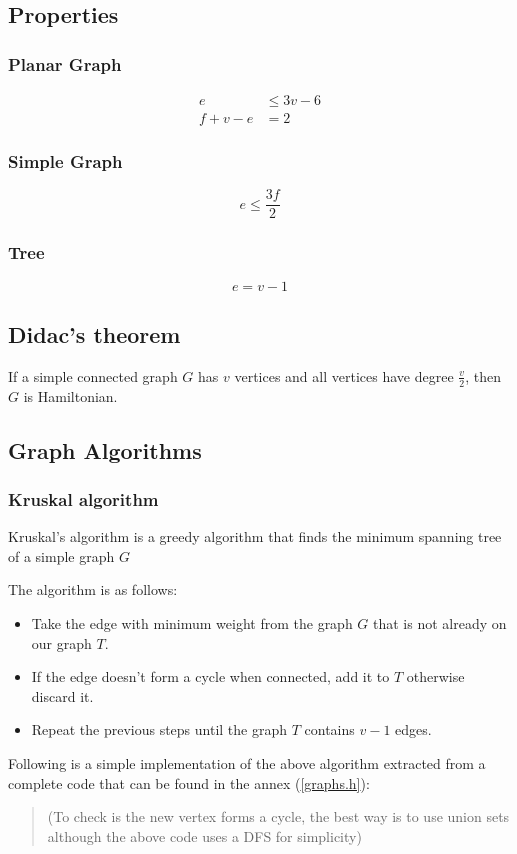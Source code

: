 \documentclass[11pt,twoside]{article}
\theoremstyle{defi}
\begin{document}
\subsection{Properties}
\subsubsection{Planar Graph}
\begin{align}
e &\leq 3v - 6 \\
f + v - e &= 2 
\end{align}
\subsubsection{Simple Graph}
\begin{equation}
e \leq \frac{3f}{2}
\end{equation}
\subsubsection{Tree}
\begin{equation}
e = v-1
\end{equation}

\subsection{Didac's theorem}
If a simple connected graph $G$ has $v$ vertices and all vertices have degree $\frac{v}{2}$, then $G$ is Hamiltonian.

\newpage

\subsection{Graph Algorithms}
\subsubsection{Kruskal algorithm}
\begin{definitionii}
Kruskal's algorithm is a greedy algorithm that finds the minimum spanning tree of a simple graph $G$
\end{definitionii}
The algorithm is as follows:
\begin{itemize}
\item Take the edge with minimum weight from the graph $G$ that is not already on our graph $T$.
\item If the edge doesn't form a cycle when connected, add it to $T$ otherwise discard it.
\item Repeat the previous steps until the graph $T$ contains $v-1$ edges.
\end{itemize}
Following is a simple implementation of the above algorithm extracted from a complete code that can be found in the annex (\ref{graphs.h}):

\begin{quote}
(To check is the new vertex forms a cycle, the best way is to use union sets although the above code uses a DFS for simplicity)
\end{quote}
\end{document}
